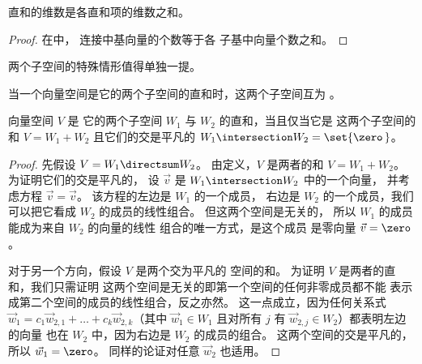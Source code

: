 \begin{corollary} \label{cor:DirSumDimsAdd}
直和的维数是各直和项的维数之和。
\end{corollary}

\begin{proof}
在中，
连接中基向量的个数等于各
子基中向量个数之和。
\end{proof}

两个子空间的特殊情形值得单独一提。

\begin{definition}
当一个向量空间是它的两个子空间的直和时，这两个子空间互为
。%
\end{definition}

\begin{lemma}
\label{le:DirectSumTwoSp}
向量空间 \( V \) 是
它的两个子空间 \( W_1 \) 与 \( W_2 \) 的直和，当且仅当它是
这两个子空间的和 \( V=W_1+W_2 \) 且它们的交是平凡的
\( W_1\intersection W_2=\set{\zero\,} \)。
\end{lemma}

\begin{proof}
先假设 $V=W_1\directsum W_2$。
由定义，$V$ 是两者的和 $V=W_1+ W_2$。
为证明它们的交是平凡的，
设 $\vec{v}$ 是 $W_1\intersection W_2$ 中的一个向量，
并考虑方程 $\vec{v}=\vec{v}$。
该方程的左边是 $W_1$ 的一个成员，
右边是 $W_2$ 的一个成员，我们可以把它看成
$W_2$ 的成员的线性组合。
但这两个空间是无关的，
所以 $W_1$ 的成员能成为来自 $W_2$ 的向量的线性
组合的唯一方式，是这个成员
是零向量 $\vec{v}=\zero$。

对于另一个方向，假设 $V$ 是两个交为平凡的
空间的和。
为证明 $V$ 是两者的直和，我们只需证明
这两个空间是无关的\Dash 即第一个空间的任何非零成员都不能
表示成第二个空间的成员的线性组合，反之亦然。
这一点成立，因为任何关系式
$\vec{w}_1=c_1\vec{w}_{2,1}+\dots+c_k\vec{w}_{2,k}$（其中 $\vec{w}_1\in W_1$
且对所有 $j$ 有 $\vec{w}_{2,j}\in W_2$）都表明左边的向量
也在 $W_2$ 中，因为右边是 $W_2$ 的成员的组合。
这两个空间的交是平凡的，所以 $\vec{w}_1=\zero$。
同样的论证对任意 $\vec{w}_2$ 也适用。
\end{proof}


